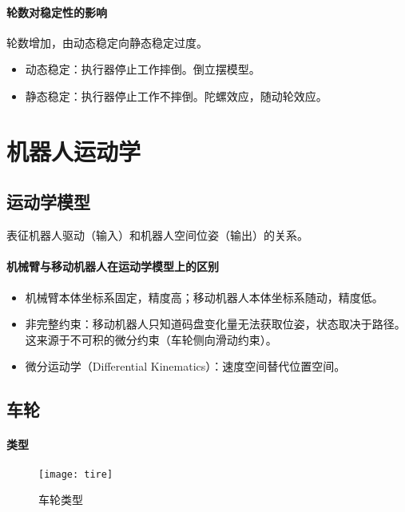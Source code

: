 \documentclass[
12pt, %
a4paper, 
oneside, %
headinclude,footinclude, %
]{scrartcl}
\begin{document}
\paragraph{轮数对稳定性的影响}
轮数增加，由动态稳定向静态稳定过度。
\begin{itemize}
\item 动态稳定：执行器停止工作摔倒。倒立摆模型。    
\item 静态稳定：执行器停止工作不摔倒。陀螺效应，随动轮效应。
\end{itemize}
\section{机器人运动学}
\subsection[运动学模型]{运动学模型}
表征机器人驱动（输入）和机器人空间位姿（输出）的关系。
\paragraph{机械臂与移动机器人在运动学模型上的区别}
\begin{itemize}
\item 机械臂本体坐标系固定，精度高；移动机器人本体坐标系随动，精度低。
\item 非完整约束：移动机器人只知道码盘变化量无法获取位姿，状态取决于路径。这来源于不可积的微分约束（车轮侧向滑动约束）。
\item 微分运动学（Differential Kinematics）：速度空间替代位置空间。
\end{itemize}
\subsection[车轮]{车轮}
\paragraph{类型}
\begin{figure}[H]
\centering 
\texttt{[image: tire]} 
\caption[车轮类型]{车轮类型}
\end{figure}
\end{document}
